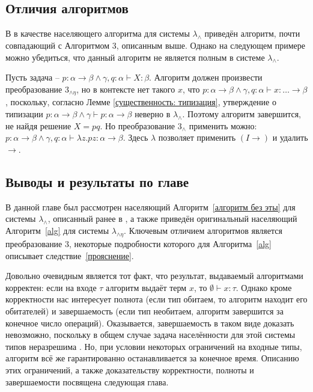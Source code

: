 \documentclass[../main.tex]{subfiles}
\begin{document}
\subsection{Отличия алгоритмов}

В \cite{kusmierek_2007} в качестве населяющего алгоритма для системы $\lambda_\wedge$ приведён алгоритм, почти совпадающий с Алгоритмом 3, описанным выше. Однако на следующем примере можно убедиться, что данный алгоритм не является полным в системе $\lambda_\wedge$.

Пусть задача -- $p \colon \alpha \to \beta \wedge \gamma, q \colon \alpha \vdash X \colon \beta$. Алгоритм должен произвести преобразование $3_{\wedge \eta}$, но в контексте нет такого $x$, что $p \colon \alpha \to \beta \wedge \gamma, q \colon \alpha \vdash x \colon \dots \to \beta$, поскольку, согласно Лемме \ref{существенность: типизация}, утверждение о типизации $p \colon \alpha \to \beta \wedge \gamma \vdash p \colon \alpha \to \beta$ неверно в $\lambda_\wedge$. Поэтому алгоритм завершится, не найдя решение $X = pq$. 
Но преобразование $3_\wedge$ применить можно: $p \colon \alpha \to \beta \wedge \gamma, q \colon \alpha \vdash \lambda z . pz \colon \alpha \to \beta$. Здесь $\lambda$ позволяет применить $(I \to)$ и удалить $\to$.

\subsection{Выводы и результаты по главе}

В данной главе был рассмотрен населяющий Алгоритм~\ref{алгоритм без эты} для системы $\lambda_\wedge$, описанный ранее в \cite{kusmierek_2007}, а также приведён оригинальный населяющий Алгоритм~\ref{alg} для системы $\lambda_{\wedge \eta}$. Ключевым отличием алгоритмов является преобразование $3$, некоторые подробности которого для Алгоритма~\ref{alg} описывает следствие~\ref{прояснение}.

Довольно очевидным является тот факт, что результат, выдаваемый алгоритмами корректен: если на входе $\tau$ алгоритм выдаёт терм $x$, то $\emptyset \vdash x \colon \tau$. Однако кроме корректности нас интересует полнота (если тип обитаем, то алгоритм находит его обитателей) и завершаемость (если тип необитаем, алгоритм завершится за конечное число операций). Оказывается, завершаемость в таком виде доказать невозможно, поскольку в общем случае задача населённости для этой системы типов неразрешима \cite{urzyczyn_1999}. Но, при условии некоторых ограничений на входные типы, алгоритм всё же гарантированно останавливается за конечное время. Описанию этих ограничений, а также доказательству корректности, полноты и завершаемости посвящена следующая глава.
\end{document}
